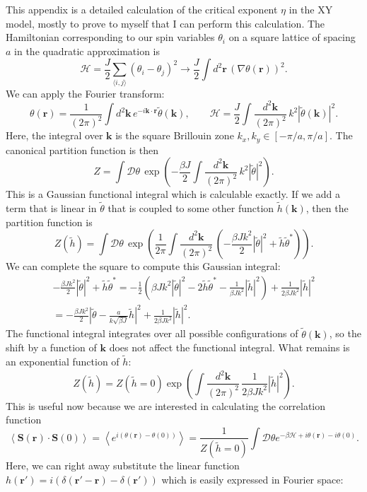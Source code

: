 \documentclass[a4paper,10pt]{article}
\newcommand{\beq}{\begin{equation}}
\newcommand{\eeq}{\end{equation}}
\renewcommand{\b}{\beta}
\renewcommand{\d}{\delta}
\renewcommand{\th}{\theta}
\newcommand{\avg}[1]{\left \langle #1 \right \rangle}
\newcommand{\abs}[1]{\ensuremath{\left | #1 \right |}}
\newcommand{\paren}[1]{\left(#1\right)}
\newcommand{\recip}[1]{\frac{1}{#1}}
\newcommand{\goto}{\rightarrow}
\newcommand{\half}[1]{\frac{#1}{2}}
\newcommand{\bv}[1]{\mathbf{#1}}
\renewcommand{\Dot}[2]{\ensuremath{\bv{#1}\cdot\bv{#2}}}
\newcommand{\br}{\ensuremath{\bv{r}}}
\begin{document}
This appendix is a detailed calculation of the critical exponent $\eta$ in 
the XY model, mostly to prove to myself that I can perform this calculation. 
The Hamiltonian corresponding to our spin variables $\th_i$ on a square lattice 
of spacing $a$ in the quadratic approximation is
\beq \mathcal H = \half{J}\sum_{\langle i,j \rangle} (\th_i - \th_j)^2 \goto 
\frac{J}{2}\int d^2\br \, \paren{\nabla \th(\br)}^2. \eeq
We can apply the Fourier transform:
\beq \th(\br) = \recip{(2\pi)^2} \int d^2\bv k \, e^{-i\Dot kr} \tilde{\th}(\bv 
k), \qquad \mathcal H = \frac{J}{2} \int \frac{d^2\bv k}{(2\pi)^2} \, k^2 
\abs{\tilde{\th}(\bv k)}^2. \eeq
Here, the integral over $\bv k$ is the square Brillouin zone $k_x,k_y\in
[-\pi/a,\pi/a]$. The canonical partition function is then
\beq Z = \int \mathcal{D}\th \, \exp\paren{-\frac{\b J}{2 } \int 
\frac{d^2\bv k}{(2\pi)^2} \, k^2\abs{\tilde{\th}}^2 }.\eeq
This is a Gaussian functional integral which is calculable exactly. If we add a 
term that is linear in $\tilde \th$ that is coupled to some other function 
$\tilde{h}(\bv k)$, then the partition function is
\beq Z(\tilde h) = \int \mathcal{D}\th \, \exp\paren{\recip{2\pi}\int 
\frac{d^2\bv k}{(2\pi)^2} \, \paren{-\frac{\b Jk^2}{2 }\abs{\tilde{\th}}^2 + 
\tilde{h}\tilde{\th}^* }}.\eeq
We can complete the square to compute this Gaussian integral:
\begin{multline} -\frac{\b Jk^2}{2 }\abs{\tilde{\th}}^2 + 
\tilde{h}\tilde{\th}^* = -\half{1} \paren{ \b Jk^2\abs{\tilde{\th}}^2 -
2\tilde{h}\tilde{\th}^* - \frac{1}{\b J k^2} \abs{\tilde{h}}^2} + 
\frac{1}{2 \b J k^2} \abs{\tilde{h}}^2 \\ = -\frac{\b J k^2}{2} 
\abs{\tilde \th - \frac{a}{k\sqrt{\b J}} \tilde h}^2 + \frac{1}{2 \b 
J k^2} \abs{\tilde{h}}^2. \end{multline}
The functional integral integrates over all possible configurations of 
$\tilde{\th}(\bv k)$, so the shift by a function of $\bv k$ does not affect the 
functional integral. What remains is an exponential function of $\tilde h$:
\beq Z(\tilde h) = Z(\tilde h = 0) \exp\paren{ \int \frac{d^2\bv 
k}{(2\pi)^2} \, \frac{1}{2 \b J 
k^2} \abs{\tilde{h}}^2}. \eeq
This is useful now because we are interested in calculating the correlation 
function
\[ \avg{\bv S(\br) \cdot \bv S(0)} = \avg{e^{i(\th(\br) - \th(0))}} = 
\recip{Z(\tilde h = 0)} \int \mathcal{D} \th e^{-\b \mathcal{H} + i\th(\br) - 
i \th(0) }.\]
Here, we can right away substitute the linear function $h(\br') = 
i\paren{\d(\br' -\br) - \d(\br') }$ which is easily expressed in 
Fourier space:
\end{document}
